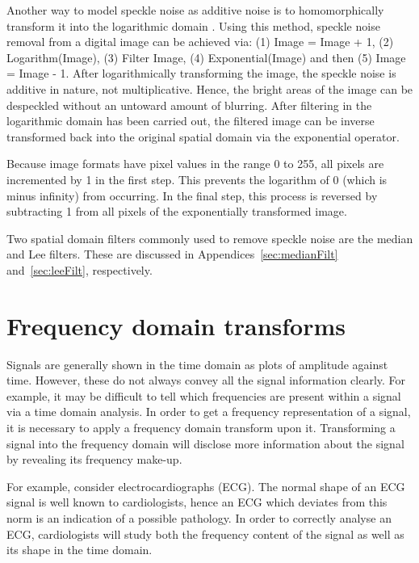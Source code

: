 \documentclass[12pt]{report}
\begin{document}
Another way to model speckle noise as additive noise is to homomorphically transform it into the logarithmic domain
\cite{stark,guo,cena}.
Using this method, speckle noise removal from a digital image can be achieved via:
(1) Image = Image + 1, (2) Logarithm(Image), (3) Filter Image, (4) Exponential(Image) and then
(5) Image = Image - 1.
After logarithmically transforming the image, the speckle noise is additive in nature, not multiplicative.
Hence, the bright areas of the image can be despeckled without an untoward amount of
blurring. After filtering in the logarithmic domain has been carried out, the
filtered image can be inverse transformed back into the original spatial domain
via the exponential operator.

Because image formats have pixel values in the range 0 to 255,
all pixels are incremented by 1 in the first step. This prevents the
logarithm of 0 (which is minus infinity) from occurring. In the final step, this
process is reversed by subtracting 1 from all pixels of the
exponentially transformed image.

Two spatial domain filters commonly used to remove speckle noise are the median and Lee filters.
These are discussed in Appendices~\ref{sec:medianFilt} and~\ref{sec:leeFilt}, respectively.
\section{Frequency domain transforms}
\label{sec:fwcNP}
Signals are generally shown in the time domain as plots of amplitude
against time. However, these do not always convey all the signal information clearly.
For example, it may be difficult to tell which frequencies are present within a signal via a
time domain analysis. In order to get a frequency representation of a signal, it is 
necessary to apply a frequency domain transform upon it.
Transforming a signal into the frequency domain will disclose more information about the 
signal by revealing its frequency make-up.

For example, consider electrocardiographs (ECG).
The normal shape of an ECG signal is well known to cardiologists, hence an ECG which deviates from this norm 
is an indication of a possible pathology. In order to correctly analyse an ECG, 
cardiologists will study both the frequency content of the signal as well as its shape
in the time domain.
\end{document}
